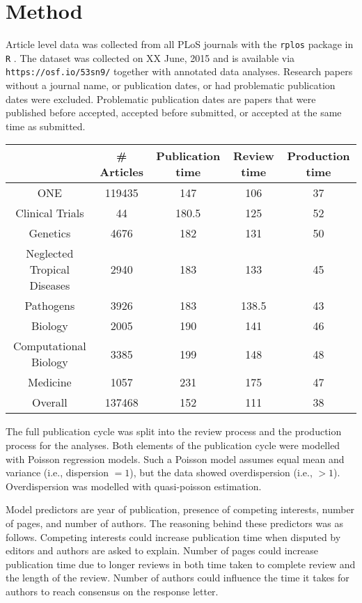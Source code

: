 \section*{Method}
Article level data was collected from all PLoS journals with the \texttt{rplos} package \cite[v0.4.7][]{rplos} in \texttt{R} \cite[v3.2.0][]{rcran}. The dataset was collected on XX June, 2015 and is available via \texttt{https://osf.io/53sn9/} together with annotated data analyses. Research papers without a journal name, or publication dates, or had problematic publication dates were excluded. Problematic publication dates are papers that were published before accepted, accepted before submitted, or accepted at the same time as submitted.

\begin{tabular}{ c c c c c }
\toprule
          & \# Articles & Publication time & Review time & Production time \\
    \midrule
    ONE   & 119435 & 147   & 106   & 37 \\
    Clinical Trials & 44    & 180.5 & 125   & 52 \\
    Genetics & 4676  & 182   & 131   & 50 \\
    Neglected Tropical Diseases & 2940  & 183   & 133   & 45 \\
    Pathogens & 3926  & 183   & 138.5 & 43 \\
    Biology & 2005  & 190   & 141   & 46 \\
    Computational Biology & 3385  & 199   & 148   & 48 \\
    Medicine & 1057  & 231   & 175   & 47 \\
    Overall & 137468 & 152   & 111   & 38 \\
    \bottomrule
\end{tabular}

The full publication cycle was split into the review process and the production process for the analyses. Both elements of the publication cycle were modelled with Poisson regression models. Such a Poisson model assumes equal mean and variance (i.e., dispersion $=1$), but the data showed overdispersion (i.e., $>1$). Overdispersion was modelled with quasi-poisson estimation.

Model predictors are year of publication, presence of competing interests, number of pages, and number of authors. The reasoning behind these predictors was as follows. Competing interests could increase publication time when disputed by editors and authors are asked to explain. Number of pages could increase publication time due to longer reviews in both time taken to complete review and the length of the review. Number of authors could influence the time it takes for authors to reach consensus on the response letter. 

